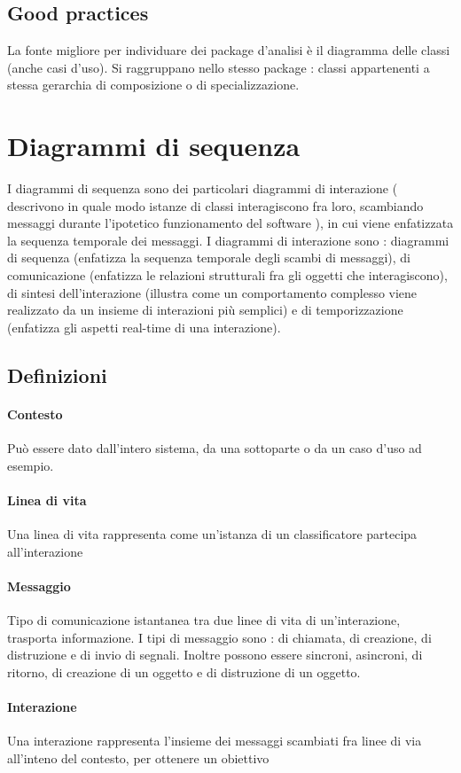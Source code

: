 \documentclass[a4paper,12pt]{report}
\begin{document}
	\subsection{Good practices}
	La fonte migliore per individuare dei package d'analisi è il diagramma delle classi (anche casi d'uso). Si raggruppano nello stesso package : classi appartenenti a stessa gerarchia di composizione o di specializzazione. 
	
	\section{Diagrammi di sequenza}
	I diagrammi di sequenza sono dei particolari diagrammi di interazione ( descrivono in quale modo istanze di classi interagiscono fra loro, scambiando messaggi durante l'ipotetico funzionamento del software ), in cui viene enfatizzata la sequenza temporale dei messaggi.
	I diagrammi di interazione sono : diagrammi di sequenza (enfatizza la sequenza temporale degli scambi di messaggi), di comunicazione (enfatizza le relazioni strutturali fra gli oggetti che interagiscono), di sintesi dell'interazione (illustra come un comportamento complesso viene realizzato da un insieme di interazioni più semplici) e di temporizzazione (enfatizza gli aspetti real-time di una interazione).
	\subsection{Definizioni}
	\paragraph{Contesto} Può essere dato dall'intero sistema, da una sottoparte o da un caso d'uso ad esempio.
	\paragraph{Linea di vita} Una linea di vita rappresenta come un'istanza di un classificatore partecipa all'interazione
	\paragraph{Messaggio} Tipo di comunicazione istantanea tra due linee di vita di un'interazione, trasporta informazione. I tipi di messaggio sono : di chiamata, di creazione, di distruzione e di invio di segnali. Inoltre possono essere sincroni, asincroni, di ritorno, di creazione di un oggetto e di distruzione di un oggetto.
	\paragraph{Interazione} Una interazione rappresenta l'insieme dei messaggi scambiati fra linee di via all'inteno del contesto, per ottenere un obiettivo
\end{document}
